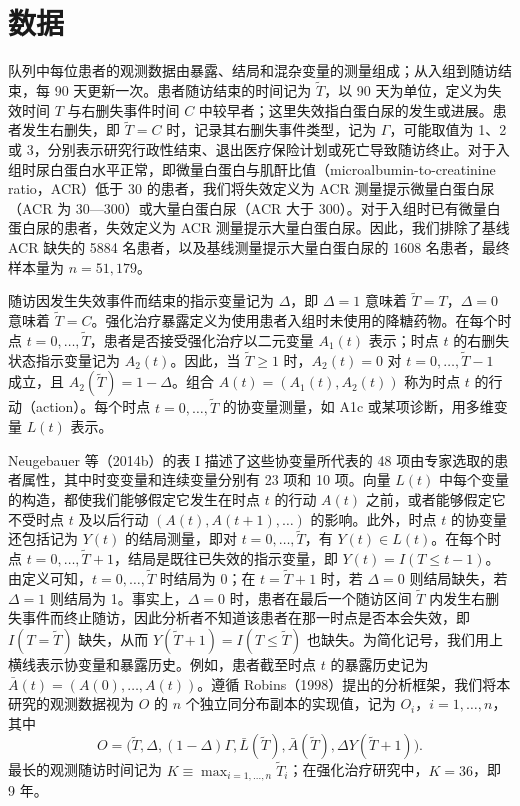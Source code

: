 \section{数据}

队列中每位患者的观测数据由暴露、结局和混杂变量的测量组成；从入组到随访结束，每 90 天更新一次。患者随访结束的时间记为 $\widetilde T$，以 90 天为单位，定义为失效时间 $T$ 与右删失事件时间 $C$ 中较早者；这里失效指白蛋白尿的发生或进展。患者发生右删失，即 $\widetilde T=C$ 时，记录其右删失事件类型，记为 $\Gamma$，可能取值为 1、2 或 3，分别表示研究行政性结束、退出医疗保险计划或死亡导致随访终止。对于入组时尿白蛋白水平正常，即微量白蛋白与肌酐比值（microalbumin-to-creatinine ratio，ACR）低于 30 的患者，我们将失效定义为 ACR 测量提示微量白蛋白尿（ACR 为 30—300）或大量白蛋白尿（ACR 大于 300）。对于入组时已有微量白蛋白尿的患者，失效定义为 ACR 测量提示大量白蛋白尿。因此，我们排除了基线 ACR 缺失的 5884 名患者，以及基线测量提示大量白蛋白尿的 1608 名患者，最终样本量为 $n=51,179$。

随访因发生失效事件而结束的指示变量记为 $\Delta$，即 $\Delta=1$ 意味着 $\widetilde T=T$，$\Delta=0$ 意味着 $\widetilde T=C$。强化治疗暴露定义为使用患者入组时未使用的降糖药物。在每个时点 $t=0,\ldots,\widetilde T$，患者是否接受强化治疗以二元变量 $A_1(t)$ 表示；时点 $t$ 的右删失状态指示变量记为 $A_2(t)$。因此，当 $\widetilde T\geq1$ 时，$A_2(t)=0$ 对 $t=0,\ldots,\widetilde T-1$ 成立，且 $A_2(\widetilde T)=1-\Delta$。组合 $A(t)=(A_1(t),A_2(t))$ 称为时点 $t$ 的行动（action）。每个时点 $t=0,\ldots,\widetilde T$ 的协变量测量，如 A1c 或某项诊断，用多维变量 $L(t)$ 表示。

Neugebauer 等（2014b）的表 I 描述了这些协变量所代表的 48 项由专家选取的患者属性，其中时变变量和连续变量分别有 23 项和 10 项。向量 $L(t)$ 中每个变量的构造，都使我们能够假定它发生在时点 $t$ 的行动 $A(t)$ 之前，或者能够假定它不受时点 $t$ 及以后行动 $(A(t),A(t+1),\ldots)$ 的影响。此外，时点 $t$ 的协变量还包括记为 $Y(t)$ 的结局测量，即对 $t=0,\ldots,\widetilde T$，有 $Y(t)\in L(t)$。在每个时点 $t=0,\ldots,\widetilde T+1$，结局是既往已失效的指示变量，即 $Y(t)=I(T\leq t-1)$。由定义可知，$t=0,\ldots,\widetilde T$ 时结局为 0；在 $t=\widetilde T+1$ 时，若 $\Delta=0$ 则结局缺失，若 $\Delta=1$ 则结局为 1。事实上，$\Delta=0$ 时，患者在最后一个随访区间 $\widetilde T$ 内发生右删失事件而终止随访，因此分析者不知道该患者在那一时点是否本会失效，即 $I(T=\widetilde T)$ 缺失，从而 $Y(\widetilde T+1)=I(T\leq\widetilde T)$ 也缺失。为简化记号，我们用上横线表示协变量和暴露历史。例如，患者截至时点 $t$ 的暴露历史记为 $\bar A(t)=(A(0),\ldots,A(t))$。遵循 Robins（1998）提出的分析框架，我们将本研究的观测数据视为 $O$ 的 $n$ 个独立同分布副本的实现值，记为 $O_i$，$i=1,\ldots,n$，其中
\[
 O=\bigl(\widetilde T,\Delta,(1-\Delta)\Gamma,\bar L(\widetilde T),
 \bar A(\widetilde T),\Delta Y(\widetilde T+1)\bigr).
\]
最长的观测随访时间记为 $K\equiv\max_{i=1,\ldots,n}\widetilde T_i$；在强化治疗研究中，$K=36$，即 9 年。


